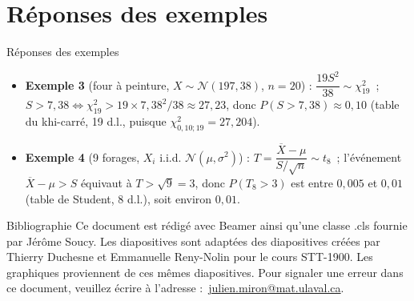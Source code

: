 \documentclass{BeamerTemplate}
\begin{document}
\section{Réponses des exemples}

\begin{frame}[t]{Réponses des exemples}
\footnotesize
\begin{itemize}
\item \textbf{Exemple 3} (four à peinture, $X\sim\mathcal{N}(197,38)$, $n=20$) : $\dfrac{19S^2}{38}\sim\chi^2_{19}$~; $S>7{,}38\Leftrightarrow\chi^2_{19}>19\times7{,}38^2/38\approx27{,}23$, donc $P(S>7{,}38)\approx0{,}10$ (table du khi-carré, 19 d.l., puisque $\chi^2_{0{,}10;19}=27{,}204$).
\item \textbf{Exemple 4} (9 forages, $X_i$ i.i.d. $\mathcal{N}(\mu,\sigma^2)$) : $T=\dfrac{\overline X-\mu}{S/\sqrt n}\sim t_{8}$~; l'événement $\overline X-\mu>S$ équivaut à $T>\sqrt 9=3$, donc $P(T_8>3)$ est entre $0{,}005$ et $0{,}01$ (table de Student, 8 d.l.), soit environ $0{,}01$.
\end{itemize}

\end{frame}



\begin{frame}{Bibliographie}
 	Ce document est rédigé avec Beamer ainsi qu'une classe .cls fournie par Jérôme Soucy. Les diapositives sont adaptées des diapositives créées par Thierry Duchesne et Emmanuelle Reny-Nolin pour le cours STT-1900. Les graphiques proviennent de ces mêmes diapositives.
 	\printbibliography
 	\vfill
 	\footnotesize Pour signaler une erreur dans ce document, veuillez écrire à l'adresse :~\href{mailto:julien.miron@mat.ulaval.ca}{julien.miron@mat.ulaval.ca}.
 \end{frame}
\end{document}
